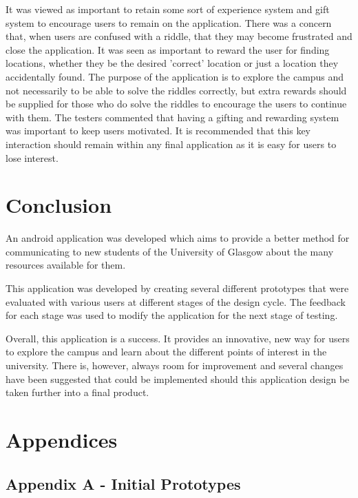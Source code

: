 \documentclass[10pt,twocolumn]{article} %
\begin{document}
It was viewed as important to retain some sort of experience system and gift system to encourage users to remain on the application. There was a concern that, when users are confused with a riddle, that they may become frustrated and close the application. It was seen as important to reward the user for finding locations, whether they be the desired 'correct' location or just a location they accidentally found. The purpose of the application is to explore the campus and not necessarily to be able to solve the riddles correctly, but extra rewards should be supplied for those who do solve the riddles to encourage the users to continue with them. The testers commented that having a gifting and rewarding system was important to keep users motivated. It is recommended that this key interaction should remain within any final application as it is easy for users to lose interest.

\section*{Conclusion}
An android application was developed which aims to provide a better method for communicating to new students of the University of Glasgow about the many resources available for them.

This application was developed by creating several different prototypes that were evaluated with various users at different stages of the design cycle. The feedback for each stage was used to modify the application for the next stage of testing. 

Overall, this application is a success. It provides an innovative, new way for users to explore the campus and learn about the different points of interest in the university. There is, however, always room for improvement and several changes have been suggested that could be implemented should this application design be taken further into a final product.


\onecolumn
\section*{Appendices}
\subsection*{Appendix A - Initial Prototypes}
\end{document}
